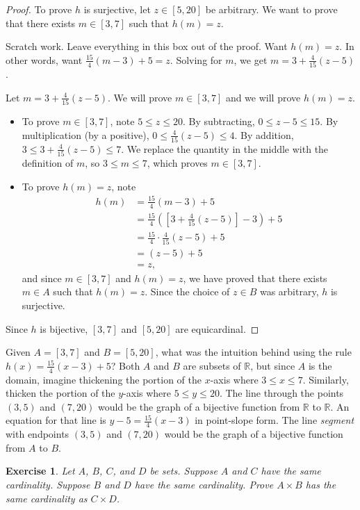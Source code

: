 \documentclass{book}
\newcounter{ekcounter}%
\theoremstyle{ekimcustom}
\newtheorem{exercise}[ekcounter]{Exercise}
\begin{document}
\begin{proof}
To prove $h$ is surjective, let $z \in [5,20]$ be arbitrary. We want to prove that there exists $m \in [3,7]$ such that $h(m)=z$.
\vskip2pt
\begin{framed}
\noindent
Scratch work. Leave everything in this box out of the proof. Want $h(m)=z$. In other words, want $\frac{15}{4}(m-3)+5=z$. Solving for $m$, we get $m=3+\frac{4}{15}(z-5)$.
\end{framed}
\noindent Let $m=3+\frac{4}{15}(z-5)$. We will prove $m \in [3,7]$ and we will prove $h(m)=z$.
\begin{itemize}
    \item To prove $m \in [3,7]$, note $5 \leq z \leq 20$. By subtracting, $0 \leq z-5 \leq 15$. By multiplication (by a positive), $0 \leq \frac{4}{15}(z-5) \leq 4$. By addition, $3 \leq 3+\frac{4}{15}(z-5)\leq 7$. We replace the quantity in the middle with the definition of $m$, so $3 \leq m \leq 7$, which proves $m \in [3,7]$.
    \item  To prove $h(m)=z$, note 
    \begin{align*}
    h(m)
    &=\textstyle\frac{15}{4}(m-3)+5\\
    &=\textstyle\frac{15}{4}([3+\frac{4}{15}(z-5)]-3)+5\\
    &=\textstyle\frac{15}{4}\cdot \frac{4}{15}(z-5)+5\\
    &=(z-5)+5\\
    &=z,
    \end{align*}
    and since $m \in [3,7]$ and $h(m)=z$, we have proved that there exists $m \in A$ such that $h(m)=z$. Since the choice of $z \in B$ was arbitrary, $h$ is surjective.
\end{itemize}
Since $h$ is bijective, $[3,7]$ and $[5,20]$ are equicardinal.
\end{proof}

Given $A=[3,7]$ and $B=[5,20]$, what was the intuition behind using the rule $h(x)= \frac{15}{4}(x-3)+5$? Both $A$ and $B$ are subsets of $\mathbb{R}$, but since $A$ is the domain, imagine thickening the portion of the $x$-axis where $3 \leq x \leq 7$. Similarly, thicken the portion of the $y$-axis where $5 \leq y \leq 20$. The line through the points $(3,5)$ and $(7,20)$ would be the graph of a bijective function from $\mathbb{R}$ to $\mathbb{R}$. An equation for that line is $y-5=\frac{15}{4}(x-3)$ in point-slope form. The line \emph{segment} with endpoints $(3,5)$ and $(7,20)$ would be the graph of a bijective function from $A$ to $B$. 

\begin{exercise}
Let $A$, $B$, $C$, and $D$ be sets. Suppose $A$ and $C$ have the same cardinality. Suppose $B$ and $D$ have the same cardinality. Prove $A \times B$ has the same cardinality as $C \times D$.%
\end{exercise}
\end{document}
